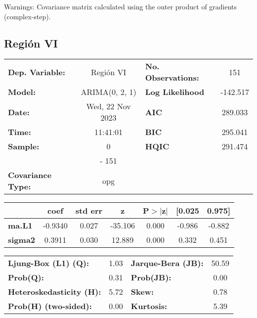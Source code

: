 \documentclass{article}%
\begin{document}
Warnings: \newline
 [1] Covariance matrix calculated using the outer product of gradients (complex-step).%
\subsection*{Región VI}%
\begin{center}
\begin{tabular}{lclc}
\toprule
\textbf{Dep. Variable:}          &    Región VI     & \textbf{  No. Observations:  } &    151      \\
\textbf{Model:}                  &  ARIMA(0, 2, 1)  & \textbf{  Log Likelihood     } &  -142.517   \\
\textbf{Date:}                   & Wed, 22 Nov 2023 & \textbf{  AIC                } &  289.033    \\
\textbf{Time:}                   &     11:41:01     & \textbf{  BIC                } &  295.041    \\
\textbf{Sample:}                 &        0         & \textbf{  HQIC               } &  291.474    \\
\textbf{}                        &       - 151      & \textbf{                     } &             \\
\textbf{Covariance Type:}        &       opg        & \textbf{                     } &             \\
\bottomrule
\end{tabular}
\begin{tabular}{lcccccc}
                & \textbf{coef} & \textbf{std err} & \textbf{z} & \textbf{P$> |$z$|$} & \textbf{[0.025} & \textbf{0.975]}  \\
\midrule
\textbf{ma.L1}  &      -0.9340  &        0.027     &   -35.106  &         0.000        &       -0.986    &       -0.882     \\
\textbf{sigma2} &       0.3911  &        0.030     &    12.889  &         0.000        &        0.332    &        0.451     \\
\bottomrule
\end{tabular}
\begin{tabular}{lclc}
\textbf{Ljung-Box (L1) (Q):}     & 1.03 & \textbf{  Jarque-Bera (JB):  } & 50.59  \\
\textbf{Prob(Q):}                & 0.31 & \textbf{  Prob(JB):          } &  0.00  \\
\textbf{Heteroskedasticity (H):} & 5.72 & \textbf{  Skew:              } &  0.78  \\
\textbf{Prob(H) (two-sided):}    & 0.00 & \textbf{  Kurtosis:          } &  5.39  \\
\bottomrule
\end{tabular}
\end{center}
\end{document}
